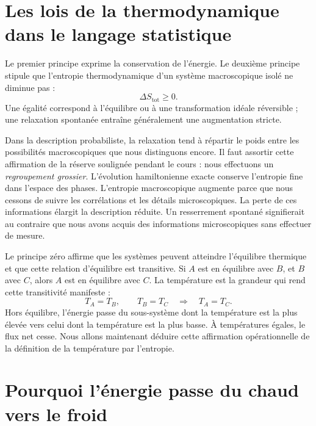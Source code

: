 \section{Les lois de la thermodynamique dans le langage statistique}

Le premier principe exprime la conservation de l’énergie. Le deuxième principe stipule que l’entropie thermodynamique d’un système macroscopique isolé ne diminue pas :
\begin{equation}
 \Delta S_{\mathrm{tot}}\geq0.
 \label{eq:sm3-second-law}
\end{equation}
Une égalité correspond à l’équilibre ou à une transformation idéale réversible ; une relaxation spontanée entraîne généralement une augmentation stricte.

Dans la description probabiliste, la relaxation tend à répartir le poids entre les possibilités macroscopiques que nous distinguons encore. Il faut assortir cette affirmation de la réserve soulignée pendant le cours : nous effectuons un \emph{regroupement grossier}. L’évolution hamiltonienne exacte conserve l’entropie fine dans l’espace des phases. L’entropie macroscopique augmente parce que nous cessons de suivre les corrélations et les détails microscopiques. La perte de ces informations élargit la description réduite. Un resserrement spontané signifierait au contraire que nous avons acquis des informations microscopiques sans effectuer de mesure.

Le principe zéro affirme que les systèmes peuvent atteindre l’équilibre thermique et que cette relation d’équilibre est transitive. Si \(A\) est en équilibre avec \(B\), et \(B\) avec \(C\), alors \(A\) est en équilibre avec \(C\). La température est la grandeur qui rend cette transitivité manifeste :
\[
 T_A=T_B,\qquad T_B=T_C
 \quad\Longrightarrow\quad
 T_A=T_C.
\]
Hors équilibre, l’énergie passe du sous-système dont la température est la plus élevée vers celui dont la température est la plus basse. À températures égales, le flux net cesse. Nous allons maintenant déduire cette affirmation opérationnelle de la définition de la température par l’entropie.

\section{Pourquoi l’énergie passe du chaud vers le froid}

